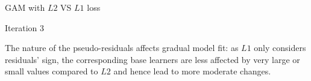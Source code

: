 \begin{frame}{GAM with $L2$ VS $L1$ loss}
{\vfill

Iteration 3
}


\vfill

\footnotesize

The nature of the pseudo-residuals affects gradual model fit: as $L1$ only
considers residuals' sign, the corresponding base learners are less affected by very large or small values
compared to $L2$ and hence lead to more moderate changes.%

\end{frame}


